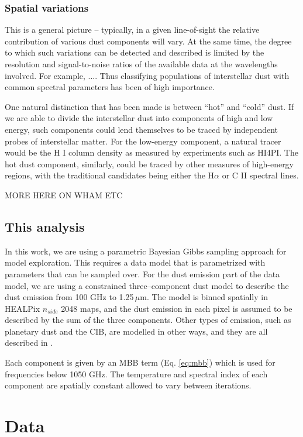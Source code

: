 \documentclass{aa}
\begin{document}
\subsubsection{Spatial variations}
This is a general picture -- typically, in a given line-of-sight the relative contribution of various dust components will vary. At the same time, the degree to which such variations can be detected and described is limited by the resolution and signal-to-noise ratios of the available data at the wavelengths involved. For example, .... Thus classifying populations of interstellar dust with common spectral parameters has been of high importance.

One natural distinction that has been made is between ``hot'' and ``cold'' dust. If we are able to divide the interstellar dust into components of high and low energy, such components could lend themselves to be traced by independent probes of interstellar matter. For the low-energy component, a natural tracer would be the H I column density as measured by experiments such as HI4PI. The hot dust component, similarly, could be traced by other measures of high-energy regions, with the traditional candidates being either the H$\alpha$ or C II spectral lines.

MORE HERE ON WHAM ETC

\subsection{This analysis}
In this work, we are using a parametric Bayesian Gibbs sampling approach for model exploration. This requires a data model that is parametrized with parameters that can be sampled over. For the dust emission part of the data model, we are using a constrained three--component dust model to describe the dust emission from 100 GHz to 1.25\,$\mu$m. The model is binned spatially in HEALPix $n_{side}$ 2048 maps, and the dust emission in each pixel is assumed to be described by the sum of the three components. Other types of emission, such as planetary dust and the CIB, are modelled in other ways, and they are all described in \citet{ref:DR2_overview}.

Each component is given by an MBB term (Eq. \eqref{eq:mbb}) which is used for frequencies below 1050 GHz. The temperature and spectral index of each component are spatially constant allowed to vary between iterations.


\clearpage
\section{Data}
\end{document}
